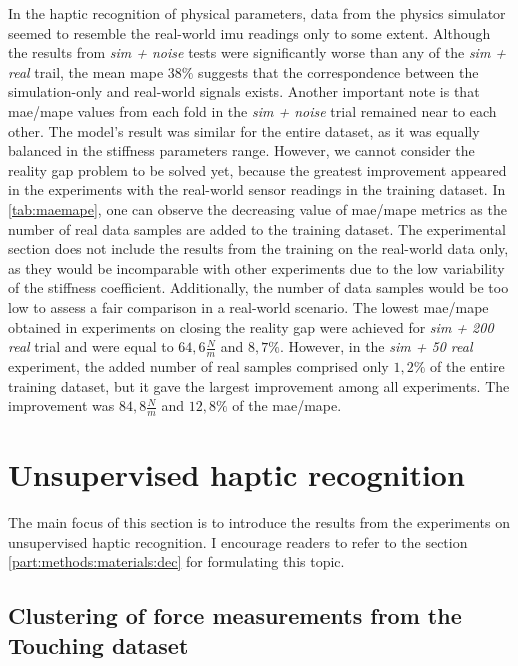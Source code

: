 \documentclass[a4paper, 10pt, twoside]{report}
\begin{document}
In the haptic recognition of physical parameters, data from the physics simulator seemed to resemble the real-world \acrshort{imu} readings only to some extent. Although the results from \textit{sim + noise} tests were significantly worse than any of the \textit{sim + real} trail, the mean \acrshort{mape} $38\%$ suggests that the correspondence between the simulation-only and real-world signals exists. Another important note is that \acrshort{mae}/\acrshort{mape} values from each fold in the \textit{sim + noise} trial remained near to each other. The model's result was similar for the entire dataset, as it was equally balanced in the stiffness parameters range. However, we cannot consider the reality gap problem to be solved yet, because the greatest improvement appeared in the experiments with the real-world sensor readings in the training dataset. In \Figure\ref{tab:maemape}, one can observe the decreasing value of \acrshort{mae}/\acrshort{mape} metrics as the number of real data samples are added to the training dataset. The experimental section does not include the results from the training on the real-world data only, as they would be incomparable with other experiments due to the low variability of the stiffness coefficient. Additionally, the number of data samples would be too low to assess a fair comparison in a real-world scenario. The lowest \acrshort{mae}/\acrshort{mape} obtained in experiments on closing the reality gap were achieved for \textit{sim + 200 real} trial and were equal to $64,6\frac{N}{m}$ and $8,7\%$. However, in the \textit{sim + 50 real} experiment, the added number of real samples comprised only $1,2\%$ of the entire training dataset, but it gave the largest improvement among all experiments. The improvement was $84,8\frac{N}{m}$ and $12,8\%$ of the \acrshort{mae}/\acrshort{mape}.

\section{Unsupervised haptic recognition}
\label{part:experiments:materials:unsupervised}

The main focus of this section is to introduce the results from the experiments on unsupervised haptic recognition. I encourage readers to refer to the section \ref{part:methods:materials:dec} for formulating this topic.

\subsection{Clustering of force measurements from the Touching dataset}
\end{document}
